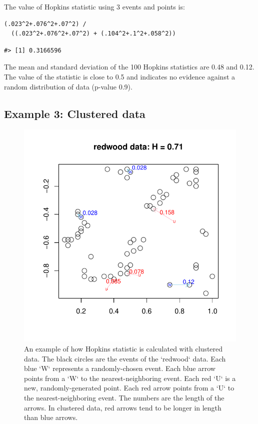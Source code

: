 The value of Hopkins statistic using 3 events and points is:

\begin{verbatim}
(.023^2+.076^2+.07^2) /
  ((.023^2+.076^2+.07^2) + (.104^2+.1^2+.058^2))
\end{verbatim}

\begin{verbatim}
#> [1] 0.3166596
\end{verbatim}

The mean and standard deviation of the 100 Hopkins statistics are 0.48 and 0.12. The value of the statistic is close to 0.5 and indicates no evidence against a random distribution of data (p-value 0.9).

\hypertarget{example-3-clustered-data}{%
\subsection{Example 3: Clustered data}\label{example-3-clustered-data}}

\begin{figure}

{\centering \includegraphics[width=0.6\linewidth]{RJ-2022-055_files/figure-latex/redwood-1} 

}

\caption{An example of how Hopkins statistic is calculated with clustered data. The black circles are the events of the `redwood` data. Each blue `W` represents a randomly-chosen event. Each blue arrow points from a `W` to the nearest-neighboring event. Each red `U` is a new, randomly-generated point. Each red arrow points from a `U` to the nearest-neighboring event. The numbers are the length of the arrows. In clustered data, red arrows tend to be longer in length than blue arrows.}\label{fig:redwood}
\end{figure}

